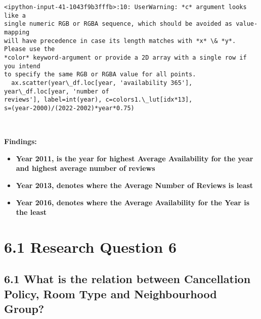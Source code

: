 \documentclass[11pt]{article}
\providecommand{\tightlist}{%
      \setlength{\itemsep}{0pt}\setlength{\parskip}{0pt}}
\begin{document}
    \begin{Verbatim}[commandchars=\\\{\}]
<ipython-input-41-1043f9b3fffb>:10: UserWarning: *c* argument looks like a
single numeric RGB or RGBA sequence, which should be avoided as value-mapping
will have precedence in case its length matches with *x* \& *y*.  Please use the
*color* keyword-argument or provide a 2D array with a single row if you intend
to specify the same RGB or RGBA value for all points.
  ax.scatter(year\_df.loc[year, 'availability 365'], year\_df.loc[year, 'number of
reviews'], label=int(year), c=colors1.\_lut[idx*13],
s=(year-2000)/(2022-2002)*year*0.75)
    \end{Verbatim}

    \begin{center}
    \end{center}
    { \hspace*{\fill} \\}
    
    \textbf{Findings:}

\begin{itemize}
\tightlist
\item
  \textbf{Year 2011, is the year for highest Average Availability for
  the year and highest average number of reviews}
\item
  \textbf{Year 2013, denotes where the Average Number of Reviews is
  least}
\item
  \textbf{Year 2016, denotes where the Average Availability for the Year
  is the least}
\end{itemize}

    \hypertarget{research-question-6}{%
\section{6.1 Research Question 6}\label{research-question-6}}

\hypertarget{what-is-the-relation-between-cancellation-policy-room-type-and-neighbourhood-group}{%
\subsection{6.1 What is the relation between Cancellation Policy, Room
Type and Neighbourhood
Group?}\label{what-is-the-relation-between-cancellation-policy-room-type-and-neighbourhood-group}}
\end{document}
